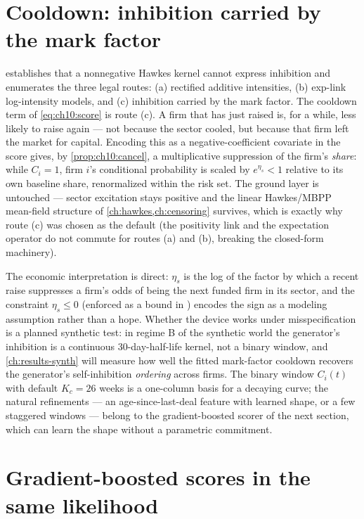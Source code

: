 \section{Cooldown: inhibition carried by the mark factor}\label{ch10:sec:cooldown}

 establishes that a nonnegative Hawkes kernel cannot
express inhibition and enumerates the three legal routes: (a) rectified
additive intensities, (b) exp-link log-intensity models, and (c)
inhibition carried by the mark factor. The cooldown term of
\cref{eq:ch10:score} is route (c). A firm that has just raised is, for a
while, less likely to raise again --- not because the sector cooled, but
because that firm left the market for capital. Encoding this as a
negative-coefficient covariate in the score gives, by
\cref{prop:ch10:cancel}, a multiplicative suppression of the firm's
\emph{share}: while $C_i = 1$, firm $i$'s conditional probability is
scaled by $e^{\eta_s} < 1$ relative to its own baseline share,
renormalized within the risk set. The ground layer is untouched --- sector
excitation stays positive and the linear Hawkes/MBPP mean-field structure
of \cref{ch:hawkes,ch:censoring} survives, which is exactly why route (c)
was chosen as the default (the positivity link and the expectation
operator do not commute for routes (a) and (b), breaking the closed-form
machinery).

The economic interpretation is direct: $\eta_s$ is the log of the factor
by which a recent raise suppresses a firm's odds of being the next funded
firm in its sector, and the constraint $\eta_s \le 0$ (enforced as a
bound in ) encodes the sign as a modeling
assumption rather than a hope. Whether the device works under
misspecification is a planned synthetic test: in regime B of the
synthetic world the generator's inhibition is a continuous
30-day-half-life kernel, not a binary window, and
\cref{ch:results-synth} will measure how well the fitted mark-factor
cooldown recovers the generator's self-inhibition \emph{ordering}
across firms. The binary window $C_i(t)$ with default
$K_c = 26$ weeks is a one-column basis for a decaying curve;
the natural refinements --- an age-since-last-deal feature with learned
shape, or a few staggered windows --- belong to the gradient-boosted
scorer of the next section, which can learn the shape without a
parametric commitment.

\section{Gradient-boosted scores in the same likelihood}\label{ch10:sec:boosted}

